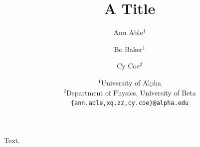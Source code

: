 \documentclass{article}
\title{A Title}
\author{%
  Ann Able$^{1}$ \\
  \and
  Bo Baker$^{1}$ \\
  \and
  Cy Coe$^{2}$ \\
  \and
 {\normalfont $^1$University of Alpha} \\
 {\normalfont $^2$Department of Physics, University of Beta} \\
 \texttt{\{ann.able,xq.zz,cy.coe\}@alpha.edu}
}
\begin{document}
\maketitle
Text.
\end{document}
